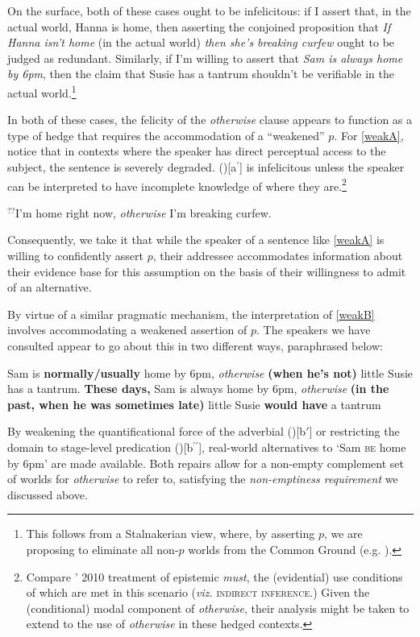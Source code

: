 On the surface, both of these cases ought to be infelicitous: if I assert that, in the actual world, Hanna is home, then asserting the conjoined proposition that \textit{If Hanna isn't home }(in the actual world) \textit{then she's breaking curfew} ought to be judged as redundant. Similarly, if I'm willing to assert that \textit{Sam is always home by 6pm}, then the claim that Susie has a tantrum shouldn't be verifiable in the actual world.\footnote{This follows from a Stalnakerian view, where, by asserting $p$, we are proposing to eliminate all non-$p$ worlds from the Common Ground (e.g. \citealt{Stalnaker1979}).}

In both of these cases, the felicity of the \textit{otherwise} clause appears to function as a type of hedge that requires the accommodation of a ``weakened'' $ p $. For \ref{weakA}, notice that in contexts where the speaker has direct perceptual access to the subject, the sentence is severely degraded. (\lastx)[a$ ^\prime $] is infelicitous unless the speaker can be interpreted to have incomplete knowledge of where they are.\footnote{Compare \citeauthor{VonFintel2010}' 2010 treatment of epistemic \textit{must}, the (evidential) use conditions of which are met in this scenario (\textit{viz.} \textsc{indirect inference}.) Given the (conditional) modal component of \textit{otherwise}, their analysis might be taken to extend to the use of \textit{otherwise} in these hedged contexts.}

\pex[exno=\ref{declarative-ant}]\a $ ^{??} $I'm home right now, \textit{otherwise} I'm breaking curfew\label{curfew}.\xe


Consequently, we take it that while the speaker of a sentence like \ref{weakA} is willing to confidently assert $ p $, their addressee accommodates information about their evidence base for this assumption on the basis of their willingness to admit of an alternative.

By virtue of a similar pragmatic mechanism, the interpretation of \ref{weakB} involves accommodating a weakened assertion of $ p $. The speakers we have consulted appear to go about this in two different ways, paraphrased below:


\pex\a[label=b$'$] Sam is \textbf{normally/usually} home by 6pm, \textit{otherwise} \textbf{(when he's not) }little Susie has a tantrum.
\a[label=b$''$] \textbf{These days,} Sam is always home by 6pm, \textit{otherwise} \textbf{(in the past, when he was sometimes late)} little Susie \textbf{would have} a tantrum\xe

By weakening the quantificational force of the adverbial (\lastx)[b$ ' $] or restricting the domain to stage-level predication (\lastx)[b$ ^{\prime\prime} $], real-world alternatives to `Sam  \textsc{be} home by 6pm' are made available. Both repairs allow for a non-empty complement set of worlds for \textit{otherwise} to refer to, satisfying the \textit{non-emptiness requirement} we discussed above. 

